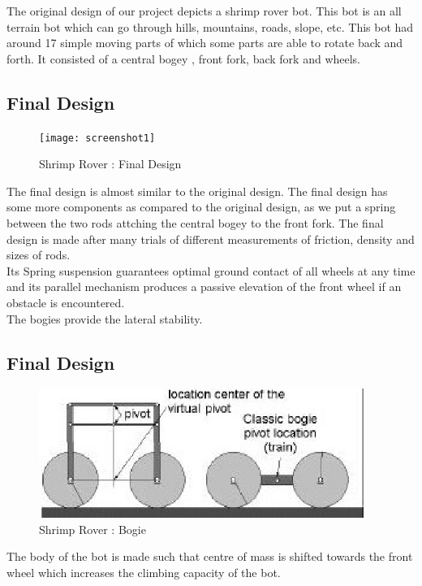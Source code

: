 \documentclass[english, 11pt]{article}
\begin{document}
The original design of our project depicts a shrimp rover bot. This
bot is an all terrain bot which can go through hills, mountains, roads, slope, etc.
This bot had around 17 simple moving parts of which some parts are able to rotate back and forth.
It consisted of a central bogey , front fork, back fork and wheels. 

\subsection{Final Design}
\begin{figure}
	\begin{center}
		\texttt{[image: screenshot1]}
	\end{center}
	\caption{Shrimp Rover : Final Design}
\end{figure}

The final design is almost similar to the original design. The final design has some more components 
as compared to the original design, as we put a spring between the two rods attching the central bogey to the front fork.
 The final design is made after many trials of different measurements of friction, density and sizes of rods. \\
 Its Spring suspension guarantees optimal ground contact of all wheels at any time and its parallel mechanism produces a passive elevation 
 of the front wheel if an obstacle is encountered.\\
 The bogies provide the lateral stability. \\
\subsection{Final Design}
\begin{figure}
	\begin{center}
		\includegraphics[width=400px]{mechanism1}
	\end{center}
	\caption{Shrimp Rover : Bogie}
\end{figure}
 
 The body of the bot is made such that centre of mass is shifted towards the front wheel which
increases the climbing capacity of the bot.
\end{document}
